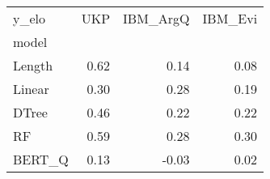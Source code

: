 \begin{tabular}{lrrr}
\toprule
y\_elo &   UKP &  IBM\_ArgQ &  IBM\_Evi \\
model  &       &           &          \\
\midrule
Length &  0.62 &      0.14 &     0.08 \\
Linear &  0.30 &      0.28 &     0.19 \\
DTree  &  0.46 &      0.22 &     0.22 \\
RF     &  0.59 &      0.28 &     0.30 \\
BERT\_Q &  0.13 &     -0.03 &     0.02 \\
\bottomrule
\end{tabular}
